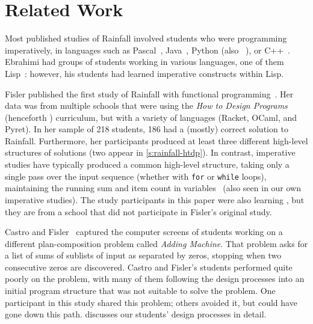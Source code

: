 \section{Related Work}
\label{s:relwork}

Most published studies of Rainfall involved students who were
programming imperatively, in languages such as
Pascal~\cite{soloway-learning86},
Java~\cite{seppala-how-hard-rainfall-koli15},
Python (also ~\cite{seppala-how-hard-rainfall-koli15}), or 
C++~\cite{simon-rainfall-harder13}.
Ebrahimi had groups of students working in various languages,
one of them Lisp~\cite{ebrahimi-rainfall}: however, his students had learned imperative
constructs within Lisp.

Fisler published the first study of Rainfall with
functional programming~\cite{fisler-recurring-rainfall14}. Her data was from
multiple schools that were using the \emph{How to Design
  Programs} (henceforth \htdp) curriculum,
but with a variety of languages (Racket, OCaml, and Pyret).
In her sample of 218 students, 186 had a (mostly) correct
solution to Rainfall.  Furthermore, her
participants produced at least three different high-level structures
of solutions (two appear in \cref{s:rainfall-htdp}).  In contrast,
imperative studies have typically produced a common high-level
structure, taking only a single pass over the input sequence (whether
with \lstinline{for} or \lstinline{while} loops),
maintaining the running sum and item count in
variables~\cite{seppala-how-hard-rainfall-koli15,simon-rainfall-harder13,soloway-learning86}
(also seen in our own imperative studies).  The
study participants in this paper were also learning \htdp, 
but they are from a school that did not participate in Fisler's
original study.


Castro and Fisler~\cite{castro-top-bottom-design16} captured the
computer screens of \htdp students working on a different
plan-composition problem called \emph{Adding Machine}. That problem
asks for a list of sums of sublists of input as separated by zeros,
stopping when two consecutive zeros are discovered.  Castro and
Fisler's students performed quite poorly on the problem, with many of
them following the \htdp design processes into an initial program
structure that was not suitable to solve the problem.  One
participant in this study shared this problem; others avoided it, but could have
gone down this path.   discusses our students' design
processes in detail.

